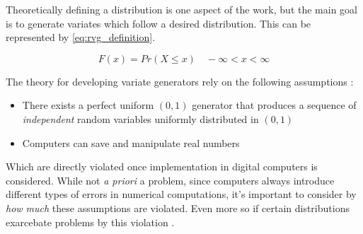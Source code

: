 Theoretically defining a distribution is one aspect of the work, but the main goal is to generate
variates which follow a desired distribution. This can be represented by \ref{eq:rvg_definition}.

\begin{equation}\label{eq:rvg_definition}
F(x) = Pr(X \leq x) \quad -\infty < x < \infty
\end{equation}

The theory for developing variate generators rely on the following assumptions \cite{kuhlHistoryRandomVariate2017}:
\begin{itemize}
    \item There exists a perfect uniform $(0,1)$ generator that produces a sequence of \textit{independent} random variables uniformly distributed in $(0,1)$
    \item Computers can save and manipulate real numbers
\end{itemize}

Which are directly violated once implementation in digital computers is considered. While not \textit{a priori} a problem, since 
computers always introduce different types of errors in numerical computations, it's important to consider by \textit{how much} these
assumptions are violated. Even more so if certain distributions exarcebate problems by this violation \cite{radicchiUnderestimatingExtremeEvents2014}.

